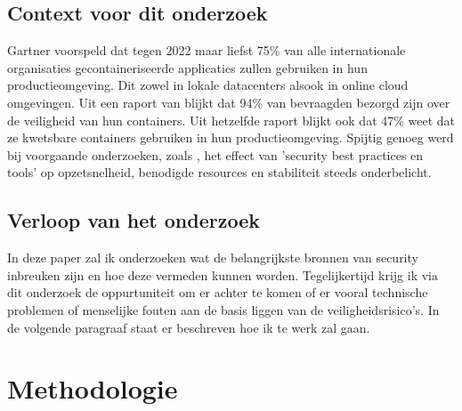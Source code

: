 \subsection{Context voor dit onderzoek}
Gartner \autocite{Gartner2019} voorspeld dat tegen 2022 maar liefst 75\% van alle internationale organisaties gecontaineriseerde
applicaties zullen gebruiken in hun productieomgeving. Dit zowel in lokale datacenters alsook in online cloud omgevingen.
Uit een raport van \textcite{Tripwire2019} blijkt dat 94\% van bevraagden bezorgd zijn over de veiligheid van hun containers. 
Uit hetzelfde raport blijkt ook dat 47\% weet dat ze kwetsbare containers gebruiken in hun productieomgeving.
Spijtig genoeg werd bij voorgaande onderzoeken, zoals \textcite{StackRox2020}, het effect van 'security best practices en tools' 
op opzetsnelheid, benodigde resources en stabiliteit steeds onderbelicht.

\subsection{Verloop van het onderzoek}
In deze paper zal ik onderzoeken wat de belangrijkste bronnen van security inbreuken zijn en hoe deze vermeden kunnen worden.
Tegelijkertijd krijg ik via dit onderzoek de oppurtuniteit om er achter te komen of er vooral technische problemen of menselijke fouten aan de basis liggen van de veiligheidsrisico's.
In de volgende paragraaf staat er beschreven hoe ik te werk zal gaan.

\section{Methodologie}
\label{sec:methodologie}


